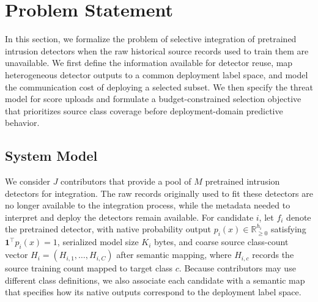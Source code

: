 \documentclass[conference]{IEEEtran}
\theoremstyle{definition}
\begin{document}
\section{Problem Statement}
\label{sec:problem}


In this section, we formalize the problem of selective integration of pretrained intrusion detectors when the raw historical source records used to train them are unavailable.
We first define the information available for detector reuse, map heterogeneous detector outputs to a common deployment label space, and model the communication cost of deploying a selected subset.
We then specify the threat model for score uploads and formulate a budget-constrained selection objective that prioritizes source class coverage before deployment-domain predictive behavior.

\subsection{System Model}

We consider $J$ contributors that provide a pool of $M$ pretrained intrusion detectors for integration.
The raw records originally used to fit these detectors are no longer available to the integration process, while the metadata needed to interpret and deploy the detectors remain available.
For candidate $i$, let $f_i$ denote the pretrained detector, with native probability output $p_i(x)\in\mathbb R_{\ge0}^{h_i}$ satisfying $\mathbf 1^\top p_i(x)=1$, serialized model size $K_i$ bytes, and coarse source class-count vector $H_i=(H_{i,1},\ldots,H_{i,C})$ after semantic mapping, where $H_{i,c}$ records the source training count mapped to target class $c$.
Because contributors may use different class definitions, we also associate each candidate with a semantic map that specifies how its native outputs correspond to the deployment label space.
\end{document}
